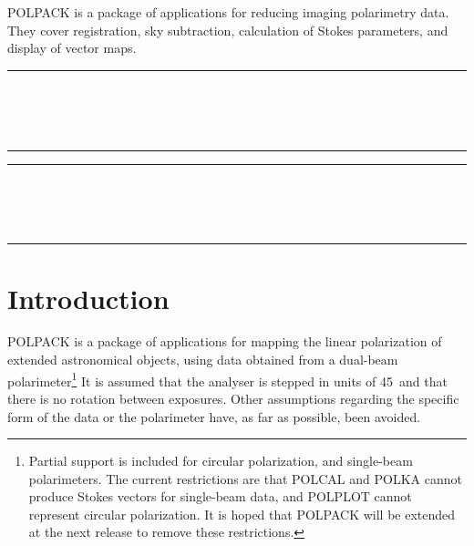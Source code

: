POLPACK is a package of applications for reducing imaging polarimetry data. 
They cover registration, sky subtraction, calculation of Stokes
parameters, and display of vector maps.

 \begin{latexonly}
   \newpage
   \markright{\stardocname}
   \null\vspace{5mm}
   \begin {center}
   \rule{80mm}{0.5mm} \\ [1ex]
   {\Large\bf \stardoctitle \\ [2.5ex]
    \normalsize \stardocversion} \\ [2ex]
   \rule{80mm}{0.5mm}
   \end{center}
   \setlength{\parskip}{0mm}
   \latexonlytoc
   \setlength{\parskip}{\medskipamount}
 \end{latexonly}
\newpage
\renewcommand{\thepage}{\arabic{page}}
\setcounter{page}{1}
\begin{latexonly}
  \begin {center}
     \rule{80mm}{0.5mm} \\ [1ex]
     {\Large\bf   \stardoctitle \\ [2.5ex]
      \normalsize \stardocversion} \\ [2ex]
    \rule{80mm}{0.5mm}
  \end{center}
\end{latexonly}

\section{Introduction}
POLPACK is a package of applications for mapping the linear polarization
of extended astronomical objects, using data obtained from a dual-beam
polarimeter\footnote{Partial support is included for circular
polarization, and single-beam polarimeters. The current restrictions are
that POLCAL and POLKA cannot produce Stokes vectors for single-beam data,
and POLPLOT cannot represent circular polarization. It is hoped that
POLPACK will be extended at the next release to remove these
restrictions.} It is assumed that the analyser is stepped in units of
45\dgs\ and that there is no rotation between exposures. Other
assumptions regarding the specific form of the data or the polarimeter
have, as far as possible, been avoided.

